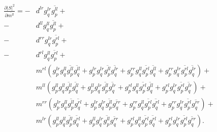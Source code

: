 \documentclass[12pt]{article}
\begin{document}
\begin{equation}
\begin{split}
\frac{\partial |S|^2}{\partial \overline{m^{ll}}} = 
	- &d^{lr} g_q^{lr} \overline{g_p^{ll}}+\\
	- &d^{ll} g_q^{ll} \overline{g_p^{ll}}+\\
	- &d^{rr} g_q^{lr} \overline{g_p^{rl}}+\\
	- &d^{rl} g_q^{ll} \overline{g_p^{rl}}+\\
	&m^{rl} \left(g_p^{lr} g_q^{ll} \overline{g_p^{ll}} \overline{g_q^{ll}} + g_p^{lr} g_q^{lr} \overline{g_p^{ll}} \overline{g_q^{lr}} + g_p^{rr} g_q^{ll} \overline{g_p^{rl}} \overline{g_q^{ll}} + g_p^{rr} g_q^{lr} \overline{g_p^{rl}} \overline{g_q^{lr}}\right)+\\
	&m^{ll} \left(g_p^{ll} g_q^{ll} \overline{g_p^{ll}} \overline{g_q^{ll}} + g_p^{ll} g_q^{lr} \overline{g_p^{ll}} \overline{g_q^{lr}} + g_p^{rl} g_q^{ll} \overline{g_p^{rl}} \overline{g_q^{ll}} + g_p^{rl} g_q^{lr} \overline{g_p^{rl}} \overline{g_q^{lr}}\right)+\\
	&m^{rr} \left(g_p^{lr} g_q^{ll} \overline{g_p^{ll}} \overline{g_q^{rl}} + g_p^{lr} g_q^{lr} \overline{g_p^{ll}} \overline{g_q^{rr}} + g_p^{rr} g_q^{ll} \overline{g_p^{rl}} \overline{g_q^{rl}} + g_p^{rr} g_q^{lr} \overline{g_p^{rl}} \overline{g_q^{rr}}\right)+\\
	&m^{lr} \left(g_p^{ll} g_q^{ll} \overline{g_p^{ll}} \overline{g_q^{rl}} + g_p^{ll} g_q^{lr} \overline{g_p^{ll}} \overline{g_q^{rr}} + g_p^{rl} g_q^{ll} \overline{g_p^{rl}} \overline{g_q^{rl}} + g_p^{rl} g_q^{lr} \overline{g_p^{rl}} \overline{g_q^{rr}}\right).
\end{split}
\end{equation}
\end{document}
